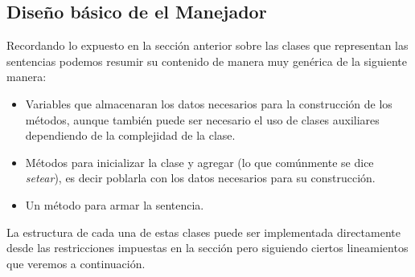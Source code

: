 \subsection{Diseño básico de el Manejador}
Recordando lo expuesto en la sección anterior sobre las clases que representan las sentencias podemos resumir su contenido de manera muy genérica de la siguiente manera:
%
\begin{itemize}
\item Variables que almacenaran los datos necesarios para la construcción de los métodos, aunque también puede ser necesario el uso de clases auxiliares dependiendo de la complejidad de la clase.
%
\item Métodos para inicializar la clase y agregar (lo que comúnmente se dice \textit{setear}), es decir poblarla con los datos necesarios para su construcción.
%
\item Un método para armar la sentencia.
%
\end{itemize}
%
La estructura de cada una de estas clases puede ser implementada directamente desde las restricciones impuestas en la sección  pero siguiendo ciertos lineamientos que veremos a continuación.

